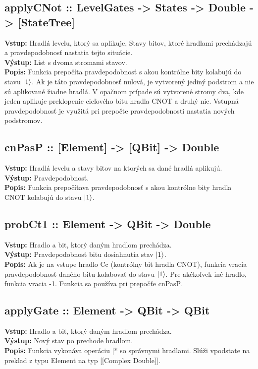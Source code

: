 \subsection*{applyCNot ::  LevelGates -> States -> Double -> [StateTree]}
\textbf{Vstup:} Hradlá levelu, ktorý sa aplikuje, Stavy bitov, ktoré hradlami
prechádzajú a pravdepodobnosť nastatia tejto situácie.\\
\textbf{Výstup:} List s dvoma stromami stavov.\\
\textbf{Popis:} Funkcia prepočíta pravdepodobnosť s akou kontrólne bity 
kolabujú do stavu \(\ket{1}\). Ak je táto pravdepodobnosť nulová, je 
vytvorený jediný podstrom a nie sú aplikované žiadne hradlá. V opačnom prípade
sú vytvorené stromy dva, kde jeden aplikuje preklopenie cieľového bitu hradla
CNOT a druhý nie. Vstupná pravdepodobnosť je využitá pri prepočte 
pravdepodobnosti nastatia nových podstromov.

\subsection*{cnPasP :: [Element] -> [QBit] -> Double}
\textbf{Vstup:} Hradlá levelu a stavy bitov na ktorých sa dané hradlá 
aplikujú.\\
\textbf{Výstup:} Pravdepodobnosť.\\
\textbf{Popis:} Funkcia prepočítava pravdepodobnosť s akou kontrólne bity 
hradla CNOT kolabujú do stavu \(\ket{1}\).

\subsection*{probCt1 :: Element -> QBit -> Double}
\textbf{Vstup:} Hradlo a bit, ktorý daným hradlom prechádza.\\
\textbf{Výstup:} Pravdepodobnosť bitu dosiahnutia stav \(\ket{1}\).\\
\textbf{Popis:} Ak je na vstupe hradlo Cc (kontrólny bit hradla CNOT), funkcia
vracia pravdepodobnosť daného bitu kolabovať do stavu \(\ket{1}\). Pre 
akékoľvek iné hradlo, funkcia vracia -1. Funkcia sa používa pri prepočťe 
cnPasP.

\subsection*{applyGate :: Element -> QBit -> QBit}
\textbf{Vstup:} Hradlo a bit, ktorý daným hradlom prechádza.\\
\textbf{Výstup:} Nový stav po prechode hradlom.\\
\textbf{Popis:} Funkcia vykonáva operáciu |* so správnymi hradlami. Slúži
vpodstate na preklad z typu Element na typ [[Complex Double]].

